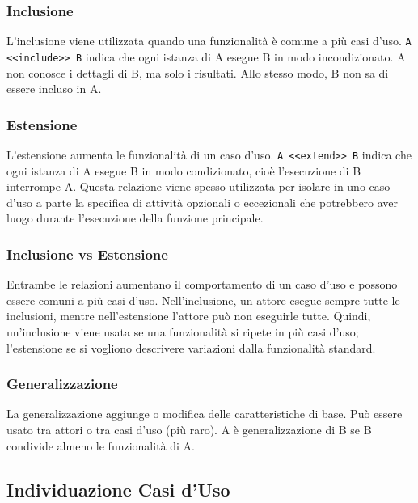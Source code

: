 \subsubsection{Inclusione}
L'inclusione viene utilizzata quando una funzionalità è comune a più casi d'uso. 
\texttt{A <<include>> B} indica che ogni istanza di A esegue B in modo incondizionato. 
A non conosce i dettagli di B, ma solo i risultati. Allo stesso modo, B non sa di essere incluso in A.

\subsubsection{Estensione}
L'estensione aumenta le funzionalità di un caso d'uso. 
\texttt{A <<extend>> B} indica che ogni istanza di A esegue B in modo condizionato, cioè l'esecuzione di B interrompe A.
Questa relazione viene spesso utilizzata per isolare in uno caso d'uso a parte la specifica di attività opzionali 
o eccezionali che potrebbero aver luogo durante l'esecuzione della funzione principale.

\subsubsection{Inclusione vs Estensione}
Entrambe le relazioni aumentano il comportamento di un caso d'uso e possono essere comuni a più casi d'uso. 
Nell'inclusione, un attore esegue sempre tutte le inclusioni, mentre nell'estensione l'attore può non eseguirle tutte.
Quindi, un'inclusione viene usata se una funzionalità si ripete in più casi d'uso; 
l'estensione se si vogliono descrivere variazioni dalla funzionalità standard. 

\subsubsection{Generalizzazione}
La generalizzazione aggiunge o modifica delle caratteristiche di base. 
Può essere usato tra attori o tra casi d'uso (più raro). 
A è generalizzazione di B se B condivide almeno le funzionalità di A.

\subsection{Individuazione Casi d'Uso}

